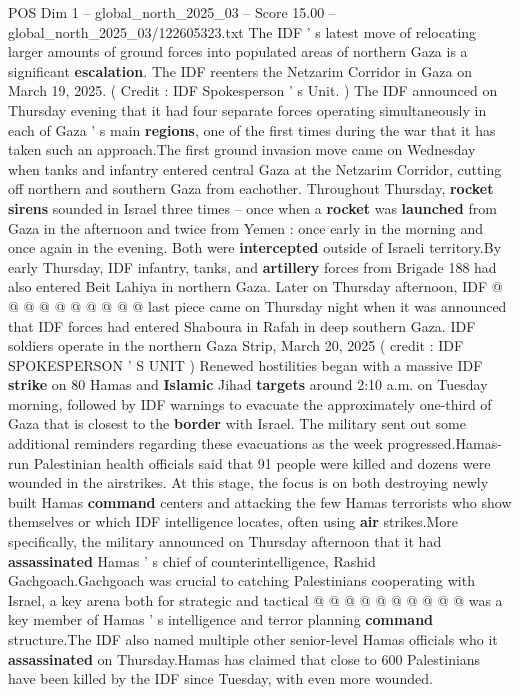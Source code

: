 \begin{textsample}{POS Dim 1 – global\_north\_2025\_03 – Score 15.00 – global\_north\_2025\_03/122605323.txt}  \label{ex:f1_pos_429}
The IDF ' s latest move of relocating larger amounts of ground forces into populated areas of northern Gaza is a significant \textbf{escalation}.
The IDF reenters the Netzarim Corridor in Gaza on March 19, 2025. ( Credit : IDF Spokesperson ' s Unit. ) The IDF announced on Thursday evening that it had four separate forces operating simultaneously in each of Gaza ' s main \textbf{regions}, one of the first times during the war that it has taken such an approach.The first ground invasion move came on Wednesday when tanks and infantry entered central Gaza at the Netzarim Corridor, cutting off northern and southern Gaza from eachother.
Throughout Thursday, \textbf{rocket} \textbf{sirens} sounded in Israel three times -- once when a \textbf{rocket} was \textbf{launched} from Gaza in the afternoon and twice from Yemen : once early in the morning and once again in the evening.
Both were \textbf{intercepted} outside of Israeli territory.By early Thursday, IDF infantry, tanks, and \textbf{artillery} forces from Brigade 188 had also entered Beit Lahiya in northern Gaza.
Later on Thursday afternoon, IDF @ @ @ @ @ @ @ @ @ @ last piece came on Thursday night when it was announced that IDF forces had entered Shaboura in Rafah in deep southern Gaza.
IDF soldiers operate in the northern Gaza Strip, March 20, 2025 ( credit : IDF SPOKESPERSON ' S UNIT ) Renewed hostilities began with a massive IDF \textbf{strike} on 80 Hamas and \textbf{Islamic} Jihad \textbf{targets} around 2:10 a.m. on Tuesday morning, followed by IDF warnings to evacuate the approximately one-third of Gaza that is closest to the \textbf{border} with Israel.
The military sent out some additional reminders regarding these evacuations as the week progressed.Hamas-run Palestinian health officials said that 91 people were killed and dozens were wounded in the airstrikes.
At this stage, the focus is on both destroying newly built Hamas \textbf{command} centers and attacking the few Hamas terrorists who show themselves or which IDF intelligence locates, often using \textbf{air} strikes.More specifically, the military announced on Thursday afternoon that it had \textbf{assassinated} Hamas ' s chief of counterintelligence, Rashid Gachgoach.Gachgoach was crucial to catching Palestinians cooperating with Israel, a key arena both for strategic and tactical @ @ @ @ @ @ @ @ @ @ was a key member of Hamas ' s intelligence and terror planning \textbf{command} structure.The IDF also named multiple other senior-level Hamas officials who it \textbf{assassinated} on Thursday.Hamas has claimed that close to 600 Palestinians have been killed by the IDF since Tuesday, with even more wounded.

\end{textsample}
